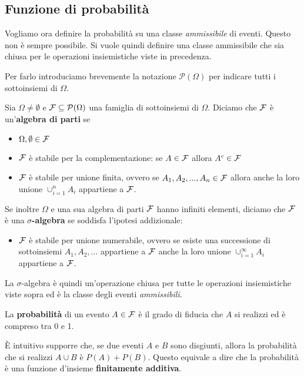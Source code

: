 \subsection{Funzione di probabilità}
Vogliamo ora definire la probabilità su una classe \emph{ammissibile} di eventi. Questo non è
sempre possibile. Si vuole quindi definire una classe ammissibile che sia chiusa per le operazioni
insiemistiche viste in precedenza.

Per farlo introduciamo brevemente la notazione $\mathcal{P}(\Omega)$ per indicare tutti i
sottoinsiemi di $\Omega$.

\begin{definition}
	Sia $\Omega \neq \emptyset$ e $\mathcal{F} \subseteq \mathcal{P}(\Omega)$ una famiglia di sottoinsiemi
	di $\Omega$. Diciamo che $\mathcal{F}$ è un'\textbf{algebra di parti} se
	\begin{itemize}
		\item $\Omega, \emptyset \in \mathcal{F}$
		\item $\mathcal{F}$ è stabile per la complementazione: se $A \in \mathcal{F}$ allora $A^c \in \mathcal{F}$
		\item $\mathcal{F}$ è stabile per unione finita, ovvero se $A_1, A_2, ..., A_n \in \mathcal{F}$ allora
		      anche la loro unione $\cup_{i=1}^n A_i$ appartiene a $\mathcal{F}$.
	\end{itemize}
	Se inoltre $\Omega$ e una sua algebra di parti $\mathcal{F}$ hanno infiniti elementi, diciamo che $\mathcal{F}$
	è una $\sigma$\textbf{-algebra} se soddisfa l'ipotesi addizionale:
	\begin{itemize}
		\item $\mathcal{F}$ è stabile per unione numerabile, ovvero se esiste una successione di
		      sottoinsiemi $A_1, A_2, ...$ appartiene a $\mathcal{F}$ anche la loro unione
		      $\cup_{i=1}^\infty A_i$ appartiene a $\mathcal{F}$.
	\end{itemize}
\end{definition}

La $\sigma$-algebra è quindi un'operazione chiusa per tutte le operazioni insiemistiche viste
sopra ed è la classe degli eventi \emph{ammissibili}.

La \textbf{probabilità} di un evento $A \in \mathcal{F}$ è il grado di fiducia che $A$ si realizzi ed è
compreso tra 0 e 1.

\`E intuitivo supporre che, se due eventi $A$ e $B$ sono disgiunti, allora la probabilità che si
realizzi $A \cup B$ è $P(A) + P(B)$. Questo equivale a dire che la probabilità è una funzione
d'insieme \textbf{finitamente additiva}.


